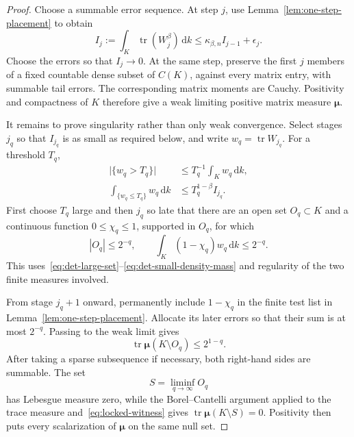 \documentclass[11pt]{article}
\theoremstyle{remark}
\newcommand{\dd}{\,\mathrm d}
\newcommand{\tr}{\operatorname{tr}}
\begin{document}
\begin{proof}
Choose a summable error sequence.  At step $j$, use
Lemma~\ref{lem:one-step-placement} to obtain
\begin{equation}
 I_j:=\int_K\tr(W_j^\beta)\dd k
 \leq\kappa_{\beta,n}I_{j-1}+\epsilon_j.
 \label{eq:det-fractional-recursion}
\end{equation}
Choose the errors so that $I_j\to0$.  At the same step, preserve the first
$j$ members of a fixed countable dense subset of $C(K)$, against every
matrix entry, with summable tail errors.  The corresponding matrix moments
are Cauchy.  Positivity and compactness of $K$ therefore give a weak limiting
positive matrix measure $\boldsymbol\mu$.

It remains to prove singularity rather than only weak convergence.  Select
stages $j_q$ so that $I_{j_q}$ is as small as required below, and write
$w_q=\tr W_{j_q}$.  For a threshold $T_q$,
\begin{align}
 \bigl|\{w_q>T_q\}\bigr|
 &\leq T_q^{-1}\int_Kw_q\dd k,
 \label{eq:det-large-set}\\
 \int_{\{w_q\leq T_q\}}w_q\dd k
 &\leq T_q^{1-\beta}I_{j_q}.
 \label{eq:det-small-density-mass}
\end{align}
First choose $T_q$ large and then $j_q$ so late that there are an open set
$O_q\subset K$ and a continuous function $0\leq\chi_q\leq1$, supported in
$O_q$, for which
\begin{equation}
 |O_q|\leq2^{-q},\qquad
 \int_K(1-\chi_q)w_q\dd k\leq2^{-q}.
 \label{eq:witness-stage}
\end{equation}
This uses~\eqref{eq:det-large-set}--\eqref{eq:det-small-density-mass} and
regularity of the two finite measures involved.

From stage $j_q+1$ onward, permanently include $1-\chi_q$ in the finite test
list in Lemma~\ref{lem:one-step-placement}.  Allocate its later errors so
that their sum is at most $2^{-q}$.  Passing to the weak limit gives
\begin{equation}
 \tr\boldsymbol\mu(K\setminus O_q)\leq2^{1-q}.
 \label{eq:locked-witness}
\end{equation}
After taking a sparse subsequence if necessary, both right-hand sides are
summable.  The set
\[
 S=\liminf_{q\to\infty}O_q
\]
has Lebesgue measure zero, while the Borel--Cantelli argument applied to the
trace measure and~\eqref{eq:locked-witness} gives
$\tr\boldsymbol\mu(K\setminus S)=0$.  Positivity then puts every
scalarization of $\boldsymbol\mu$ on the same null set.
\end{proof}
\end{document}
